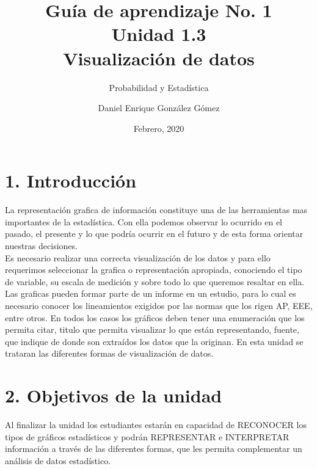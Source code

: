\documentclass[base=hide,11pt]{elegantbook}
\title{Guía de  aprendizaje No. 1\\
	Unidad  1.3 \\
	Visualización de datos}
\subtitle{Probabilidad y Estadística}
\author{Daniel Enrique González Gómez}
\institute{Pontificia Universidad Javeriana Cali}
\date{Febrero, 2020}
\begin{document}

\maketitle

\frontmatter
%
\mainmatter
\section*{1. Introducción}

La representación grafica de información constituye una de las herramientas mas importantes de la estadística. Con ella podemos observar lo  ocurrido  en  el pasado, el  presente y lo que  podría ocurrir en el futuro y de esta forma orientar nuestras decisiones. \\

Es necesario realizar una  correcta visualización de los datos y para ello requerimos seleccionar la grafica o representación apropiada, conociendo el tipo de variable, su escala de medición y sobre todo lo que queremos resaltar en ella. \\

Las graficas pueden formar parte de un informe en un estudio, para lo cual es necesario conocer los lineamientos exigidos por las normas que los rigen AP, EEE, entre otros. En todos los casos los gráficos deben tener una  enumeración que los permita citar, titulo que permita visualizar lo que están  representando, fuente,  que indique de donde  son extraídos los datos que  la originan. En esta unidad se trataran las diferentes  formas de visualización de datos.

\section*{2. Objetivos de la unidad}

Al finalizar la unidad los estudiantes estarán  en  capacidad de  RECONOCER los  tipos de gráficos estadísticos y podrán REPRESENTAR e INTERPRETAR  información a  través  de las diferentes formas, que les permita complementar un  análisis de datos estadístico.
\end{document}
